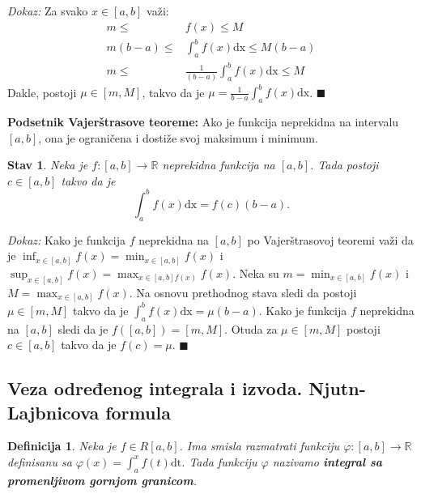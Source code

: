 \documentclass{article}
\newtheorem{definicija}{Definicija}[section]
\newtheorem{stav}{Stav}[section]
\begin{document}
\textit{Dokaz:} Za svako $x \in [a, b]$ važi:
\begin{align*}
    m \leq      & f(x) \leq M                                  \\
    m(b-a) \leq & \int^b_a f(x)\text{dx} \leq M(b-a)           \\
    m \leq      & \frac{1}{(b-a)}\int^b_a f(x)\text{dx} \leq M
\end{align*}
Dakle, postoji $\mu\in[m, M]$, takvo da je $\displaystyle \mu=\frac{1}{b-a}\int^b_a f(x)\text{dx}$.
\null\hfill $\blacksquare$\par
\begin{teoremabox}
    \textbf{Podsetnik Vajerštrasove teoreme:} Ako je funkcija neprekidna na intervalu $[a,b]$, ona je ograničena i
    dostiže svoj maksimum i minimum.

\end{teoremabox}
\begin{stavbox}
    \label{Stav_2.12}
    \begin{stav}
        Neka je $f: [a, b] \longrightarrow \mathbb{R}$ neprekidna funkcija na $[a, b]$. Tada postoji $c\in [a,b]$ takvo da je
        $$ \int^b_a f(x)\text{dx} = f(c)(b-a).$$
    \end{stav}
\end{stavbox}
\textit{Dokaz:} Kako je funkcija $f$ neprekidna na $[a, b]$ po Vajerštrasovoj teoremi važi da je $\displaystyle \inf_{x\in[a,b]} f(x) = \min_{x \in [a, b]} f(x)$ i
$\displaystyle \sup_{x\in[a,b]} f(x) = \max_{x \in [a, b] f(x)}f(x)$. Neka su $\displaystyle m = \min_{x\in[a,b]} f(x)$ i  $\displaystyle M = \max_{x\in[a,b]} f(x)$.
Na osnovu prethodnog stava sledi da postoji $\mu \in [m, M]$ takvo da je $\displaystyle \int^b_a f(x) \text{dx} = \mu (b-a)$. Kako je funkcija $f$ neprekidna
na $[a, b]$ sledi da je $f([a,b]) = [m, M]$. Otuda za $\mu \in [m, M]$ postoji $c \in [a, b]$ takvo da je $f(c) = \mu$.
\null\hfill $\blacksquare$\par

\subsection{Veza određenog integrala i izvoda. Njutn-Lajbnicova formula}
\begin{defbox}
    \begin{definicija}
        Neka je $f \in R[a, b]$. Ima smisla razmatrati funkciju $\varphi:[a, b] \longrightarrow \mathbb{R}$ definisanu sa $\varphi (x) = \displaystyle \int^x_a f(t)\text{dt}$. Tada funkciju
        $\varphi$ nazivamo \textbf{integral sa promenljivom gornjom granicom}.
    \end{definicija}
\end{defbox}
\end{document}
